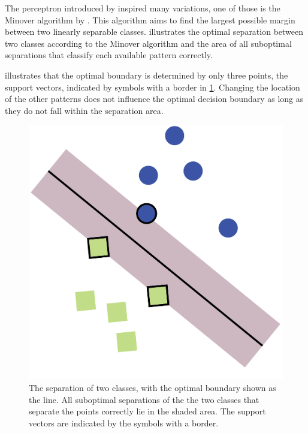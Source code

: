 The perceptron introduced by \citeauthor{rosenblatt1958perceptron} inspired many variations, one of those is the Minover algorithm by \citeauthor{krauth1987learning}. This algorithm aims to find the largest possible margin between two linearly separable classes.  illustrates the optimal separation between two classes according to the Minover algorithm and the area of all suboptimal separations that classify each available pattern correctly. 

 illustrates that the optimal boundary is determined by only three points, the support vectors, indicated by symbols with a border in \cref{fig:1:optimalSolution}. Changing the location of the other patterns does not influence the optimal decision boundary as long as they do not fall within the separation area.

\begin{figure}
	\centering
	\includegraphics[width=0.9\columnwidth]{./img/optimalboundary-01}
	\caption{The separation of two classes, with the optimal boundary shown as the line. All suboptimal separations of the the two classes that separate the points correctly lie in the shaded area. The support vectors are indicated by the symbols with a border.}
	\label{fig:1:optimalSolution}
\end{figure}